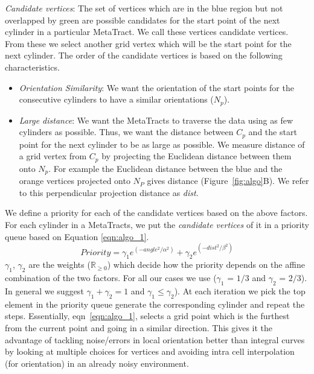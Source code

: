 \textit{Candidate vertices}: The set of vertices which are in the blue region but not overlapped by green are possible candidates for the start point of the next cylinder in a particular MetaTract. We call these vertices candidate vertices. From these we select another grid vertex which will be the start point for the next cylinder.
The order of the candidate vertices is based on the following characteristics.
\begin{itemize}
\item \textit{Orientation Similarity}: We want the orientation of the start points for the consecutive cylinders to have a similar orientations ($N_p$). 


\item \textit{Large distance}: We want the MetaTracts to traverse the data using as few cylinders as possible. Thus, we want the distance between $C_p$ and the start point for the next cylinder to be as large as possible. We measure distance of a grid vertex from $C_p$ by projecting the Euclidean distance between them onto $N_p$. For example the Euclidean distance between the blue and the orange vertices projected onto $N_P$ gives distance (Figure~\ref{fig:algo}B). We refer to this perpendicular projection distance as \textit{dist}. 
\end{itemize}
We define a priority  for each of the candidate vertices based on the above factors.
For each cylinder in a MetaTracts, we put the \textit{candidate vertices} of it in a priority queue based on Equation \ref{eqn:algo_1}.
\begin{equation}
Priority = \gamma_1 e^{(-angle^2 / \alpha^2)} + \gamma_2e^{(-dist^2 / \beta^2)}
\label{eqn:algo_1}
\end{equation}
 $\gamma_1$, $\gamma_2$ are the  weights ($\mathbb{R}_{\ge 0}$)  which decide how the priority depends on the affine combination of the two factors. For all our cases we use ($\gamma_1$ = $1 / 3 $ and $\gamma_2$ = $2 / 3$). In general we suggest $\gamma_1 +\gamma_2 = 1 $ and $\gamma_1 \leq \gamma_2$). At each iteration we pick the top element in the priority queue generate the corresponding cylinder and repeat the steps. Essentially, eqn~\ref{eqn:algo_1}, selects a grid point which is the furthest from the current point and going in a similar direction. This gives it the advantage of tackling noise/errors in local orientation better than integral curves by looking at multiple choices for vertices and avoiding intra cell interpolation (for orientation) in an already noisy environment. 
 
